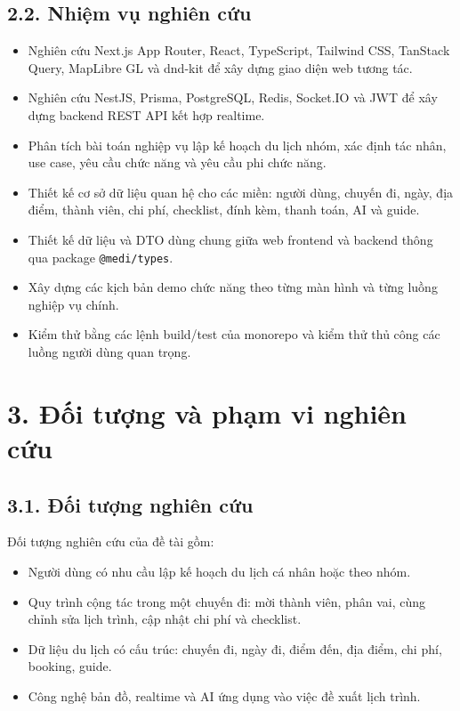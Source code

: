 \documentclass[a4paper]{report}
\begin{document}
\subsection*{2.2. Nhiệm vụ nghiên cứu}

\begin{itemize}
  \item Nghiên cứu Next.js App Router, React, TypeScript, Tailwind CSS, TanStack Query, MapLibre GL và dnd-kit để xây dựng giao diện web tương tác.
  \item Nghiên cứu NestJS, Prisma, PostgreSQL, Redis, Socket.IO và JWT để xây dựng backend REST API kết hợp realtime.
  \item Phân tích bài toán nghiệp vụ lập kế hoạch du lịch nhóm, xác định tác nhân, use case, yêu cầu chức năng và yêu cầu phi chức năng.
  \item Thiết kế cơ sở dữ liệu quan hệ cho các miền: người dùng, chuyến đi, ngày, địa điểm, thành viên, chi phí, checklist, đính kèm, thanh toán, AI và guide.
  \item Thiết kế dữ liệu và DTO dùng chung giữa web frontend và backend thông qua package \texttt{@medi/types}.
  \item Xây dựng các kịch bản demo chức năng theo từng màn hình và từng luồng nghiệp vụ chính.
  \item Kiểm thử bằng các lệnh build/test của monorepo và kiểm thử thủ công các luồng người dùng quan trọng.
\end{itemize}

\section*{3. Đối tượng và phạm vi nghiên cứu}

\subsection*{3.1. Đối tượng nghiên cứu}

Đối tượng nghiên cứu của đề tài gồm:

\begin{itemize}
  \item Người dùng có nhu cầu lập kế hoạch du lịch cá nhân hoặc theo nhóm.
  \item Quy trình cộng tác trong một chuyến đi: mời thành viên, phân vai, cùng chỉnh sửa lịch trình, cập nhật chi phí và checklist.
  \item Dữ liệu du lịch có cấu trúc: chuyến đi, ngày đi, điểm đến, địa điểm, chi phí, booking, guide.
  \item Công nghệ bản đồ, realtime và AI ứng dụng vào việc đề xuất lịch trình.
\end{itemize}
\end{document}
